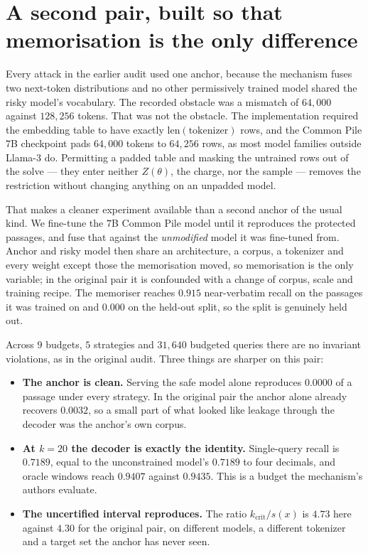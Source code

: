 
\section{A second pair, built so that memorisation is the only difference}\label{sec:second-anchor}

Every attack in the earlier audit used one anchor, because the mechanism fuses two next-token
distributions and no other permissively trained model shared the risky model's vocabulary. The
recorded obstacle was a mismatch of $64{,}000$ against $128{,}256$ tokens. That was not the
obstacle. The implementation required the embedding table to have exactly $\mathrm{len}(\text{tokenizer})$
rows, and the Common Pile $7$B checkpoint pads $64{,}000$ tokens to $64{,}256$ rows, as most model
families outside Llama-3 do. Permitting a padded table and masking the untrained rows out of the
solve --- they enter neither $Z(\theta)$, the charge, nor the sample --- removes the restriction
without changing anything on an unpadded model.

That makes a cleaner experiment available than a second anchor of the usual kind. We fine-tune the
$7$B Common Pile model until it reproduces the protected passages, and fuse that against the
\emph{unmodified} model it was fine-tuned from. Anchor and risky model then share an architecture,
a corpus, a tokenizer and every weight except those the memorisation moved, so memorisation is the
only variable; in the original pair it is confounded with a change of corpus, scale and training
recipe. The memoriser reaches $0.915$ near-verbatim recall on the passages it was trained on and
$0.000$ on the held-out split, so the split is genuinely held out.

Across $9$ budgets, $5$ strategies and $31{,}640$ budgeted queries there are no invariant
violations, as in the original audit. Three things are sharper on this pair:

\begin{itemize}
\item \textbf{The anchor is clean.} Serving the safe model alone reproduces $0.0000$ of a passage
      under every strategy. In the original pair the anchor alone already recovers $0.0032$, so a
      small part of what looked like leakage through the decoder was the anchor's own corpus.
\item \textbf{At $k=20$ the decoder is exactly the identity.} Single-query recall is $0.7189$,
      equal to the unconstrained model's $0.7189$ to four decimals, and oracle windows reach
      $0.9407$ against $0.9435$. This is a budget the mechanism's authors evaluate.
\item \textbf{The uncertified interval reproduces.} The ratio $k_{\mathrm{crit}}/s(x)$ is $4.73$
      here against $4.30$ for the original pair, on different models, a different tokenizer and a
      target set the anchor has never seen.
\end{itemize}

